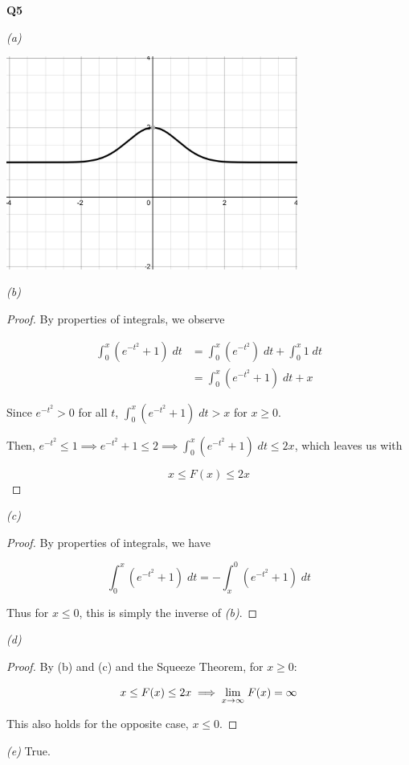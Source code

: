 \documentclass[12pt, a4paper]{article}
\begin{document}
\textbf{Q5}

\textit{(a)}

\includegraphics[height=7cm]{q5graph.jpg}

\textit{(b)}

\begin{proof}
    By properties of integrals, we observe

    \begin{align*}
        \int_0^x (e^{-t^2} + 1)\;dt & = \int_0^x (e^{-t^2}) \; dt + \int_0^x 1 \; dt\\
        & = \int_0^x (e^{-t^2} + 1) \; dt + x
    \end{align*}

    Since $e^{-t^2} > 0$ for all $t$, $\int_0^x (e^{-t^2} + 1)\;dt > x$ for $x \geq 0$.

    Then, $e^{-t^2} \leq 1 \implies e^{-t^2} + 1 \leq 2 \implies \int_0^x (e^{-t^2} + 1)\;dt \leq 2x$,
    which leaves us with

    \[
        x \leq F(x) \leq 2x
    \]
\end{proof}

\textit{(c)}

\begin{proof}
    By properties of integrals, we have

    \[
        \int_0^x (e^{-t^2} + 1)\;dt = -\int_x^0 (e^{-t^2} + 1)\;dt
    \]

    Thus for $x \leq 0$, this is simply the inverse of \textit{(b)}.
\end{proof}

\textit{(d)}

\begin{proof}
    By (b) and (c) and the Squeeze Theorem, for $x \geq 0$:

    \[
        x \leq F(x) \leq 2x \implies \displaystyle{\lim_{x \to \infty}\;} F(x) = \infty
    \]

    This also holds for the opposite case, $x \leq 0$.
\end{proof}

\textit{(e)} True.
\end{document}
